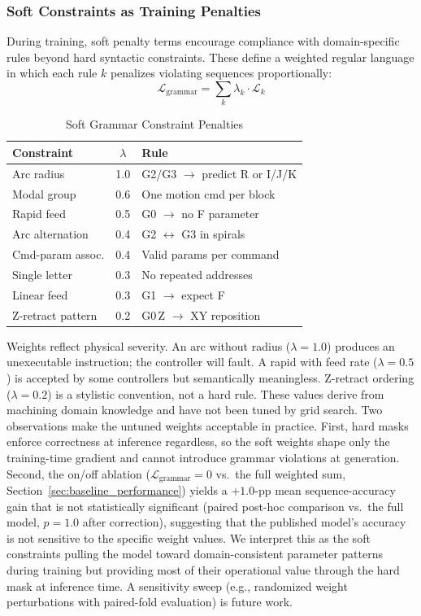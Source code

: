 \documentclass[sensors,article,submit,moreauthors,pdftex]{Definitions/mdpi}
\begin{document}
\subsubsection{Soft Constraints as Training Penalties}

During training, soft penalty terms encourage compliance with domain-specific rules beyond hard syntactic constraints. These define a weighted regular language in which each rule $k$ penalizes violating sequences proportionally:
\begin{equation}
    \mathcal{L}_{\text{grammar}} = \sum_{k} \lambda_k \cdot \mathcal{L}_k
\end{equation}

\begin{table}[htbp]
\centering
\caption{Soft Grammar Constraint Penalties}
\label{tab:soft_constraints}
\small
\begin{tabular}{@{}lcp{3.8cm}@{}}
\toprule
\textbf{Constraint} & $\lambda$ & \textbf{Rule} \\
\midrule
Arc radius         & 1.0 & G2/G3 $\to$ predict R or I/J/K \\
Modal group        & 0.6 & One motion cmd per block \\
Rapid feed         & 0.5 & G0 $\to$ no F parameter \\
Arc alternation    & 0.4 & G2 $\leftrightarrow$ G3 in spirals \\
Cmd-param assoc.   & 0.4 & Valid params per command \\
Single letter      & 0.3 & No repeated addresses \\
Linear feed        & 0.3 & G1 $\to$ expect F \\
Z-retract pattern  & 0.2 & G0\,Z $\to$ XY reposition \\
\bottomrule
\end{tabular}
\normalsize
\end{table}

Weights reflect physical severity. An arc without radius ($\lambda=1.0$) produces an unexecutable instruction; the controller will fault. A rapid with feed rate ($\lambda=0.5$) is accepted by some controllers but semantically meaningless. Z-retract ordering ($\lambda=0.2$) is a stylistic convention, not a hard rule. These values derive from machining domain knowledge and have not been tuned by grid search. Two observations make the untuned weights acceptable in practice. First, hard masks enforce correctness at inference regardless, so the soft weights shape only the training-time gradient and cannot introduce grammar violations at generation. Second, the on/off ablation ($\mathcal{L}_{\text{grammar}} = 0$ vs.\ the full weighted sum, Section~\ref{sec:baseline_performance}) yields a $+1.0$-pp mean sequence-accuracy gain that is not statistically significant (paired post-hoc comparison vs.\ the full model, $p = 1.0$ after correction), suggesting that the published model's accuracy is not sensitive to the specific weight values. We interpret this as the soft constraints pulling the model toward domain-consistent parameter patterns during training but providing most of their operational value through the hard mask at inference time. A sensitivity sweep (e.g., randomized weight perturbations with paired-fold evaluation) is future work.
\end{document}
